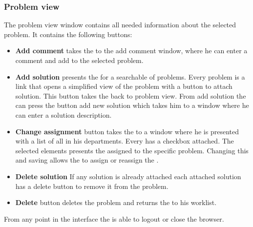 \subsubsection{Problem view}
The problem view window contains all needed information about the selected problem. It contains the following buttons: 
\begin{itemize}
\item \textbf{Add comment}  takes the \astaff{} to the add comment window, where he can enter a comment and add to the selected problem. 

\item \textbf{Add solution} presents the \astaff{} for a searchable of problems. Every problem is a link that opens a simplified view of the problem with a button to attach solution. This button takes the \astaff{} back to problem view. From add solution the \astaff{} can press the button add new solution which takes him to a window where he can enter a solution description. 

\item \textbf{Change assignment} button takes the \astaff{} to a window where he is presented with a list of all \staff{} in his departments. Every \staff{} has a checkbox attached. The selected elements presents the \staff{} assigned to the specific problem. Changing this and saving allows the \astaff{} to assign or reassign the \astaff{}. 

\item \textbf{Delete solution} If any solution is already attached each attached solution has a delete button to remove it from the problem. 

\item \textbf{Delete} button deletes the problem and returns the \staff{} to his worklist.

\end{itemize}
From any point in the interface the \astaff{} is able to logout or close the browser. 








